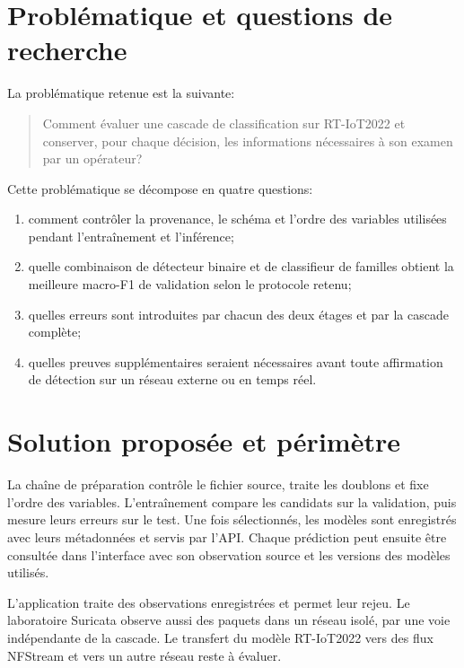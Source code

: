 \section{Probl\'ematique et questions de recherche}

La probl\'ematique retenue est la suivante:

\begin{quote}
Comment évaluer une cascade de classification sur RT-IoT2022 et conserver,
pour chaque décision, les informations nécessaires à son examen par un opérateur?

\end{quote}

Cette probl\'ematique se d\'ecompose en quatre questions:

\begin{enumerate}
  \item comment contrôler la provenance, le sch\'ema et l'ordre des variables
        utilis\'ees pendant l'entra\^inement et l'inf\'erence;
  \item quelle combinaison de d\'etecteur binaire et de classifieur de familles
        obtient la meilleure macro-F1 de validation selon le protocole retenu;
  \item quelles erreurs sont introduites par chacun des deux \'etages et par la
        cascade compl\`ete;
  \item quelles preuves suppl\'ementaires seraient n\'ecessaires avant toute
        affirmation de d\'etection sur un r\'eseau externe ou en temps r\'eel.
\end{enumerate}

\section{Solution propos\'ee et p\'erim\`etre}

La chaîne de préparation contrôle le fichier source, traite les doublons et
fixe l'ordre des variables. L'entraînement compare les candidats sur la
validation, puis mesure leurs erreurs sur le test. Une fois sélectionnés, les
modèles sont enregistrés avec leurs métadonnées et servis par l'API. Chaque
prédiction peut ensuite être consultée dans l'interface avec son observation
source et les versions des modèles utilisés.

L'application traite des observations enregistrées et permet leur rejeu. Le
laboratoire Suricata observe aussi des paquets dans un réseau isolé, par une voie
indépendante de la cascade. Le transfert du modèle RT-IoT2022 vers des flux
NFStream et vers un autre réseau reste à évaluer.

